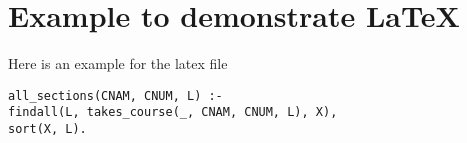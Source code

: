 \section{Example to demonstrate LaTeX}

Here is an example for the latex file

\begin{lstlisting}
all_sections(CNAM, CNUM, L) :- 
findall(L, takes_course(_, CNAM, CNUM, L), X),
sort(X, L).
\end{lstlisting}
